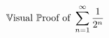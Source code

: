 \documentclass[preview]{standalone}
\begin{document}
\begin{align*}
\special{dvisvgm:raw <g id='unique000'>}\mathbb{V}\text{isual } \mathbb{P}\text{roof of } \sum_{n=1}^{\infty} \frac{1}{2^n}\special{dvisvgm:raw </g>}
\end{align*}
\end{document}
